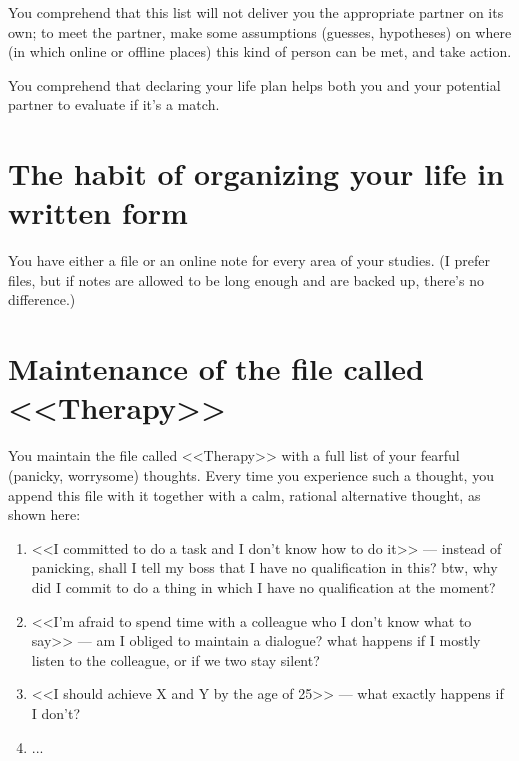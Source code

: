 \documentclass[11pt]{article}
\theoremstyle{remark}
\theoremstyle{definition}
\begin{document}
You comprehend that this list will not deliver you the appropriate partner on its own; to meet the partner, make some assumptions (guesses, hypotheses) on where (in which online or offline places) this kind of person can be met, and take action.

You comprehend that declaring your life plan helps both you and your potential partner to evaluate if it's a match.





\section{The habit of organizing your life in written form}



You have either a file or an online note for every area of your studies. (I prefer files, but if notes are allowed to be long enough and are backed up, there's no difference.)






\section{Maintenance of the file called <<Therapy>>}





You maintain the file called <<Therapy>> with a full list of your fearful (panicky, worrysome) thoughts. Every time you experience such a thought, you append this file with it together with a calm, rational alternative thought, as shown here: 

\begin{enumerate}

\item <<I committed to do a task and I don't know how to do it>> --- instead of panicking, shall I tell my boss that I have no qualification in this? btw, why did I commit to do a thing in which I have no qualification at the moment?

\item <<I'm afraid to spend time with a colleague who I don't know what to say>> --- am I obliged to maintain a dialogue? what happens if I mostly listen to the colleague, or if we two stay silent? 

\item <<I should achieve X and Y by the age of 25>> --- what exactly happens if I don't? 

\item ...

\end{enumerate}
\end{document}
